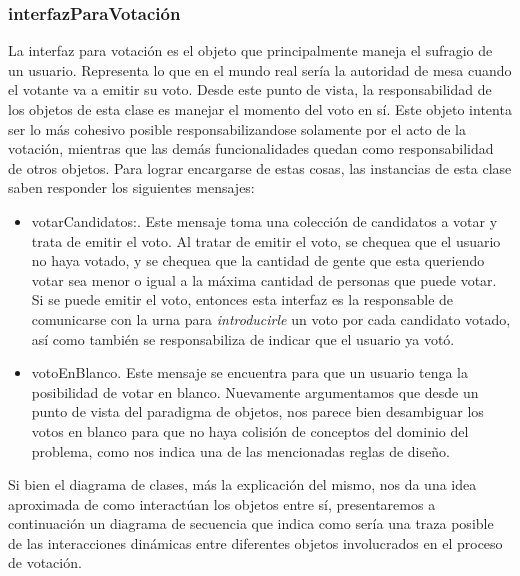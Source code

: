 \subsubsection{interfazParaVotaci\'on}

La interfaz para votaci\'on es el objeto que principalmente maneja el sufragio de un usuario. Representa lo que en el mundo real ser\'ia la autoridad de mesa cuando el votante va a emitir su voto. Desde este punto de vista, la responsabilidad de los objetos de esta clase es manejar el momento del voto en s\'i. Este objeto intenta ser lo m\'as cohesivo posible responsabilizandose solamente por el acto de la votaci\'on, mientras que las dem\'as funcionalidades quedan como responsabilidad de otros objetos. Para lograr encargarse de estas cosas, las instancias de esta clase saben responder los siguientes mensajes:

\begin{itemize}
\item votarCandidatos:. Este mensaje toma una colecci\'on de candidatos a votar y trata de emitir el voto. Al tratar de emitir el voto, se chequea que el usuario no haya votado, y se chequea que la cantidad de gente que esta queriendo votar sea menor o igual a la m\'axima cantidad de personas que puede votar. Si se puede emitir el voto, entonces esta interfaz es la responsable de comunicarse con la urna para \emph{introducirle} un voto por cada candidato votado, as\'i como tambi\'en se responsabiliza de indicar que el usuario ya vot\'o.
\item votoEnBlanco. Este mensaje se encuentra para que un usuario tenga la posibilidad de votar en blanco. Nuevamente argumentamos que desde un punto de vista del paradigma de objetos, nos parece bien desambiguar los votos en blanco para que no haya colisi\'on de conceptos del dominio del problema, como nos indica una de las mencionadas reglas de dise\~{n}o.
\end{itemize}




\bigskip

Si bien el diagrama de clases, m\'as la explicaci\'on del mismo, nos da una idea aproximada de como interact\'uan los objetos entre s\'i, presentaremos a continuaci\'on un diagrama de secuencia que indica como ser\'ia una traza posible de las interacciones din\'amicas entre diferentes objetos involucrados en el proceso de votaci\'on.


\bigskip

